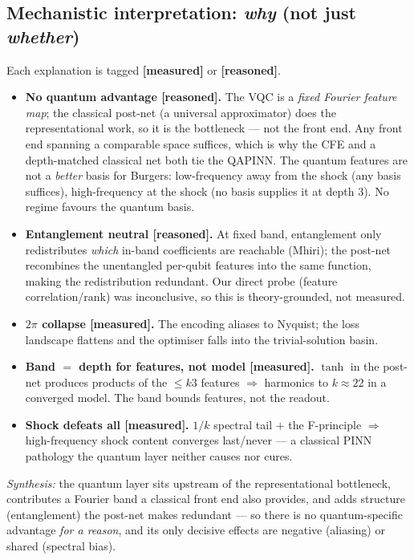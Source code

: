 \documentclass[11pt]{article}
\begin{document}
\subsection{Mechanistic interpretation: \emph{why} (not just \emph{whether})}
\label{sec:why}
Each explanation is tagged \textbf{[measured]} or \textbf{[reasoned]}.
\begin{itemize}[nosep]
  \item \textbf{No quantum advantage [reasoned].} The VQC is a \emph{fixed Fourier
  feature map}; the classical post-net (a universal approximator) does the
  representational work, so it is the bottleneck --- not the front end. Any front end
  spanning a comparable space suffices, which is why the CFE and a depth-matched
  classical net both tie the QAPINN. The quantum features are not a \emph{better} basis
  for Burgers: low-frequency away from the shock (any basis suffices), high-frequency at
  the shock (no basis supplies it at depth 3). No regime favours the quantum basis.
  \item \textbf{Entanglement neutral [reasoned].} At fixed band, entanglement only
  redistributes \emph{which} in-band coefficients are reachable (Mhiri); the post-net
  recombines the unentangled per-qubit features into the same function, making the
  redistribution redundant. Our direct probe (feature correlation/rank) was
  inconclusive, so this is theory-grounded, not measured.
  \item \textbf{$2\pi$ collapse [measured].} The encoding aliases to Nyquist; the loss
  landscape flattens and the optimiser falls into the trivial-solution basin.
  \item \textbf{Band $=$ depth for features, not model [measured].} $\tanh$ in the
  post-net produces products of the $\le\!k3$ features $\Rightarrow$ harmonics to
  $k\!\approx\!22$ in a converged model. The band bounds features, not the readout.
  \item \textbf{Shock defeats all [measured].} $1/k$ spectral tail $+$ the F-principle
  $\Rightarrow$ high-frequency shock content converges last/never --- a classical PINN
  pathology the quantum layer neither causes nor cures.
\end{itemize}
\emph{Synthesis:} the quantum layer sits upstream of the representational bottleneck,
contributes a Fourier band a classical front end also provides, and adds structure
(entanglement) the post-net makes redundant --- so there is no quantum-specific
advantage \emph{for a reason}, and its only decisive effects are negative (aliasing) or
shared (spectral bias).
\end{document}
